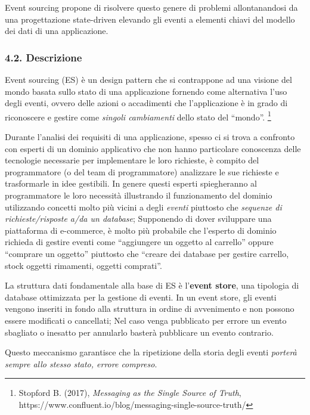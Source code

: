 \documentclass[]{article}
\begin{document}
Event sourcing propone di risolvere questo genere di problemi
allontanandosi da una progettazione state-driven elevando gli eventi a
elementi chiavi del modello dei dati di una applicazione.

\subsubsection{4.2. Descrizione}\label{descrizione}

Event sourcing (ES) è un design pattern che si contrappone ad una
visione del mondo basata sullo stato di una applicazione fornendo come
alternativa l'uso degli eventi, ovvero delle azioni o accadimenti che
l'applicazione è in grado di riconoscere e gestire come \emph{singoli
cambiamenti} dello stato del ``mondo''. \footnote{Stopford B. (2017),
  \emph{Messaging as the Single Source of Truth},\\
  https://www.confluent.io/blog/messaging-single-source-truth/}

Durante l'analisi dei requisiti di una applicazione, spesso ci si trova
a confronto con esperti di un dominio applicativo che non hanno
particolare conoscenza delle tecnologie necessarie per implementare le
loro richieste, è compito del programmatore (o del team di
programmatore) analizzare le sue richieste e trasformarle in idee
gestibili. In genere questi esperti spiegheranno al programmatore le
loro necessità illustrando il funzionamento del dominio utilizzando
concetti molto più vicini a degli \emph{eventi} piuttosto che
\emph{sequenze di richieste/risposte a/da un database}; Supponendo di
dover sviluppare una piattaforma di e-commerce, è molto più probabile
che l'esperto di dominio richieda di gestire eventi come ``aggiungere un
oggetto al carrello'' oppure ``comprare un oggetto'' piuttosto che
``creare dei database per gestire carrello, stock oggetti rimamenti,
oggetti comprati''.

La struttura dati fondamentale alla base di ES è l'\textbf{event store},
una tipologia di database ottimizzata per la gestione di eventi. In un
event store, gli eventi vengono inseriti in fondo alla struttura in
ordine di avvenimento e non possono essere modificati o cancellati; Nel
caso venga pubblicato per errore un evento sbagliato o inesatto per
annularlo basterà pubblicare un evento contrario.

\newpage

Questo meccanismo garantisce che la ripetizione della storia degli
eventi \emph{porterà sempre allo stesso stato, errore compreso}.
\end{document}

